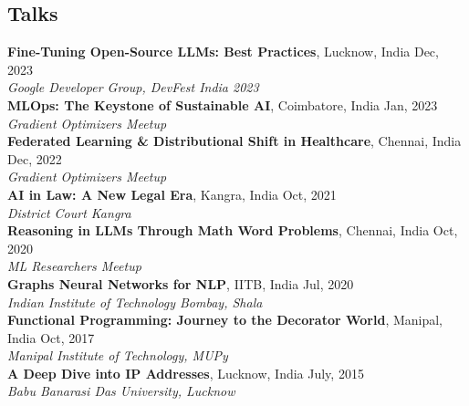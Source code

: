 \documentclass[margin,line]{res}
\begin{document}
\begin{resume}
{{\section{\sc Talks}
{\textbf {Fine-Tuning Open-Source LLMs: Best Practices}, Lucknow, India \hfill {Dec, 2023}}\\
{\em Google Developer Group, DevFest India 2023 }
\vspace*{.3cm}\\
{\textbf {MLOps: The Keystone of Sustainable AI}, Coimbatore, India \hfill {Jan, 2023}}\\
{\em Gradient Optimizers Meetup }
\vspace*{.3cm}\\
{\textbf {Federated Learning \& Distributional Shift in Healthcare}, Chennai, India \hfill {Dec, 2022}}\\
{\em Gradient Optimizers Meetup }
\vspace*{.3cm}\\
{\textbf {AI in Law: A New Legal Era}, Kangra, India \hfill  {Oct, 2021}}\\
{\em District Court Kangra }
\vspace*{.3cm}\\
{\textbf {Reasoning in LLMs Through Math Word Problems}, Chennai, India \hfill {Oct, 2020}}\\
{\em ML Researchers Meetup }
\vspace*{.3cm}\\
{\textbf {Graphs Neural Networks for NLP}, IITB, India \hfill  Jul, 2020\\
{\em Indian Institute of Technology Bombay, Shala }}
\vspace*{.3cm}\\
{\textbf {Functional Programming: Journey to the Decorator World}, Manipal, India \hfill  Oct, 2017\\
{\em Manipal Institute of Technology, MUPy }}
\vspace*{.3cm}\\
{\textbf {A Deep Dive into IP Addresses}, Lucknow, India \hfill  July, 2015\\
{\em Babu Banarasi Das University, Lucknow }}
\vspace*{.3cm}\\




}}
\end{resume}
\end{document}
